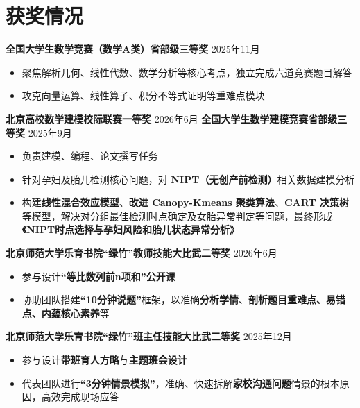 	
	\vspace{-8pt}
	\section{\makebox[\widthof{\faGraduationCap}][c]{\color{WHU_Blue}{\faTrophy}}\quad 获奖情况}
		
		\textbf{全国大学生数学竞赛（数学A类）省部级三等奖} \hfill 2025年11月%
		\begin{itemize}
			\item 聚焦解析几何、线性代数、数学分析等核心考点，独立完成六道竞赛题目解答
			\item 攻克向量运算、线性算子、积分不等式证明等重难点模块
		\end{itemize}
		
		
		\textbf{北京高校数学建模校际联赛一等奖} \hfill 2026年6月\newline
		\textbf{全国大学生数学建模竞赛省部级三等奖} \hfill 2025年9月
		\begin{itemize}
			\item 负责建模、编程、论文撰写任务
			\item 针对孕妇及胎儿检测核心问题，对 \textbf{NIPT（无创产前检测）}相关数据建模分析
			\item 构建\textbf{线性混合效应模型}、\textbf{改进 Canopy-Kmeans 聚类算法}、\textbf{CART 决策树}等模型，解决对分组最佳检测时点确定及女胎异常判定等问题，最终形成\textbf{《NIPT时点选择与孕妇风险和胎儿状态异常分析》}
		\end{itemize}
		
		\textbf{北京师范大学乐育书院“绿竹”教师技能大比武二等奖} \hfill 2026年6月%
		\begin{itemize}
			\item 参与设计\textbf{“等比数列前n项和”公开课}
			\item 协助团队搭建\textbf{“10分钟说题”}框架，以准确\textbf{分析学情}、\textbf{剖析题目重难点、易错点、内蕴核心素养}等
		\end{itemize}
		
		
		\textbf{北京师范大学乐育书院“绿竹”班主任技能大比武二等奖} \hfill 2025年12月%
		\begin{itemize}
			\item 参与设计\textbf{带班育人方略}与\textbf{主题班会设计}
			\item 代表团队进行\textbf{“3分钟情景模拟”}，准确、快速拆解\textbf{家校沟通问题}情景的根本原因，高效完成现场应答
		\end{itemize}
		
		
		
